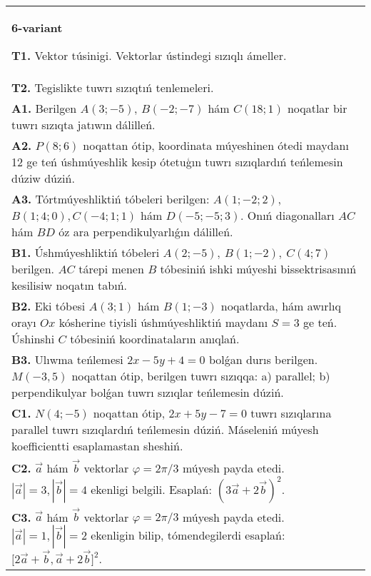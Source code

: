\documentclass{article}
\begin{document}
\begin{tabular}{m{17cm}}
\textbf{6-variant}

\textbf{T1.} 
Vektor túsinigi. Vektorlar ústindegi sızıqlı ámeller.
 \\
\textbf{T2.} 
Tegislikte tuwrı sızıqtıń tenlemeleri.
 \\
\textbf{A1.} 
Berilgen $A (3; -5) $, $B (-2; -7) $ hám
$C (18; 1) $ noqatlar bir tuwrı sızıqta jatıwın dálilleń.
 \\
\textbf{A2.} 
$P (8;6) $ noqattan ótip, koordinata múyeshinen ótedi
maydanı 12 ge teń úshmúyeshlik kesip ótetuģın tuwrı sızıqlardıń teńlemesin dúziw
dúziń.
 \\
\textbf{A3.} 
Tórtmúyeshliktiń tóbeleri berilgen:
$A (1; - 2;2) $, $B (1;4;0),C (- 4;1;1) $ hám $D (- 5; -5;3) $. Onıń diagonalları $AC$ hám $BD$ óz ara
perpendikulyarlıǵın dálilleń.
 \\
\textbf{B1.} 
Úshmúyeshliktiń tóbeleri \(A (2;-5),\ B (1;-2),\ C (4;7) \)
berilgen. $AC$ tárepi menen $B$ tóbesiniń ishki múyeshi
bissektrisasınıń kesilisiw noqatın tabıń.
 \\
\textbf{B2.} 
Eki tóbesi \(A (3;1) \) hám \(B (1;-3) \) noqatlarda, hám
awırlıq orayı $Ox$ kósherine tiyisli úshmúyeshliktiń maydanı
\(S=3\) ge teń. Úshinshi $C$ tóbesiniń koordinataların anıqlań.
 \\
\textbf{B3.} 
Ulıwma teńlemesi \(2x-5y+4=0\) bolǵan durıs
berilgen. \(M (-3,5) \) noqattan ótip, berilgen tuwrı sızıqqa: a) parallel;
b) perpendikulyar bolǵan tuwrı sızıqlar teńlemesin dúziń.
 \\
\textbf{C1.} 
\(N (4;-5) \) noqattan ótip, $2x+5y-7=0$
tuwrı sızıqlarına parallel tuwrı sızıqlardıń teńlemesin dúziń. Máseleniń múyesh
koefficientti esaplamastan sheshiń.
 \\
\textbf{C2.} 
$\vec{a}$ hám $\vec{b}$ vektorlar $\varphi = 2\pi/3$ múyesh payda etedi. $|\vec{a}| = 3,|\vec{b}| = 4$ ekenligi belgili. Esaplań: $ (3\vec{a} + 2\vec{b}) ^{2}$.
 \\
\textbf{C3.} 
$\vec{a}$ hám $\vec{b}$ vektorlar $\varphi = 2\pi/3$ múyesh payda etedi. $|\vec{a}| = 1,|\vec{b}| = 2$ ekenligin bilip, tómendegilerdi esaplań:
$\lbrack 2\overrightarrow{a} + \overrightarrow{b},\overrightarrow{a} + 2\overrightarrow{b}\rbrack^{2}$.
 \\

\end{tabular}
\vspace{1cm}
\end{document}

